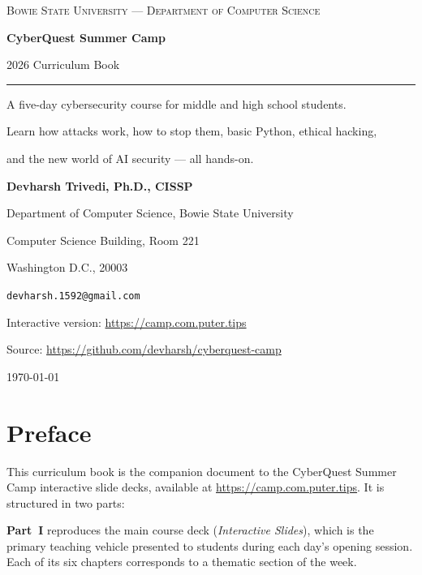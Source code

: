 \documentclass[12pt,openany]{book}
\begin{document}
\begin{titlepage}
\centering
\vspace*{2cm}
{\large\textsc{Bowie State University --- Department of Computer Science}\par}
\vspace{1.5cm}
{\Huge\bfseries\color{accent} CyberQuest Summer Camp\par}
\vspace{0.5cm}
{\LARGE\color{accent2} 2026 Curriculum Book\par}
\vspace{0.8cm}
\noindent\rule{0.6\linewidth}{1.2pt}\par
\vspace{0.8cm}
{\large A five-day cybersecurity course for middle and high school students.\par
Learn how attacks work, how to stop them, basic Python, ethical hacking,\par
and the new world of AI security --- all hands-on.\par}
\vspace{1.5cm}
{\large\textbf{Devharsh Trivedi, Ph.D., CISSP}\par}
{\normalsize Department of Computer Science, Bowie State University\par
Computer Science Building, Room 221\par
Washington D.C., 20003\par
\texttt{devharsh.1592@gmail.com}\par}
\vspace{1.5cm}
{\normalsize\color{gray}
Interactive version: \url{https://camp.com.puter.tips}\par
Source: \url{https://github.com/devharsh/cyberquest-camp}\par}
\vspace{2cm}
{\normalsize\today\par}
\end{titlepage}


\frontmatter
\chapter*{Preface}
This curriculum book is the companion document to the CyberQuest Summer Camp interactive
slide decks, available at \url{https://camp.com.puter.tips}. It is structured in two parts:

\textbf{Part~I} reproduces the main course deck (\textit{Interactive Slides}), which is the
primary teaching vehicle presented to students during each day's opening session.
Each of its six chapters corresponds to a thematic section of the week.
\end{document}
